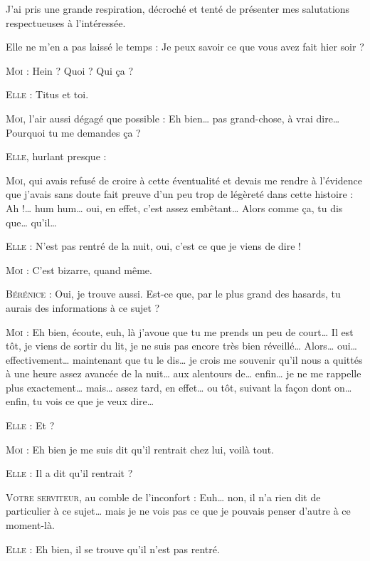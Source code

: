 
J’ai pris une grande respiration, décroché et tenté de présenter mes salutations respectueuses à l’intéressée.

\begin{dialogue}

Elle ne m’en a pas laissé le temps : Je peux savoir ce que vous avez fait hier soir ?

\textsc{Moi} : Hein ? Quoi ? Qui ça ?

\textsc{Elle} : Titus et toi.

\textsc{Moi}, l’air aussi dégagé que possible : Eh bien… pas grand-chose, à vrai dire… Pourquoi tu me demandes ça ?

\textsc{Elle}, hurlant presque : 

\textsc{Moi}, qui avais refusé de croire à cette éventualité et devais me rendre à l’évidence que j’avais sans doute fait preuve d’un peu trop de légèreté dans cette histoire : Ah !… hum hum… oui, en effet, c’est assez embêtant… Alors comme ça, tu dis que… qu’il…

\textsc{Elle} : N’est pas rentré de la nuit, oui, c’est ce que je viens de dire !

\textsc{Moi} : C’est bizarre, quand même.

\textsc{Bérénice} : Oui, je trouve aussi. Est-ce que, par le plus grand des hasards, tu aurais des informations à ce sujet ?

\textsc{Moi} : Eh bien, écoute, euh, là j’avoue que tu me prends un peu de court… Il est tôt, je viens de sortir du lit, je ne suis pas encore très bien réveillé… Alors… oui… effectivement… maintenant que tu le dis… je crois me souvenir qu’il nous a quittés à une heure assez avancée de la nuit… aux alentours de… enfin… je ne me rappelle plus exactement… mais… assez tard, en effet… ou tôt, suivant la façon dont on… enfin, tu vois ce que je veux dire…

\textsc{Elle} : Et ?

\textsc{Moi} : Eh bien je me suis dit qu’il rentrait chez lui, voilà tout.

\textsc{Elle} : Il a dit qu’il rentrait ?

\textsc{Votre serviteur}, au comble de l’inconfort : Euh… non, il n’a rien dit de particulier à ce sujet… mais je ne vois pas ce que je pouvais penser d’autre à ce moment-là.

\textsc{Elle} : Eh bien, il se trouve qu’il n’est pas rentré.


\end{dialogue}
